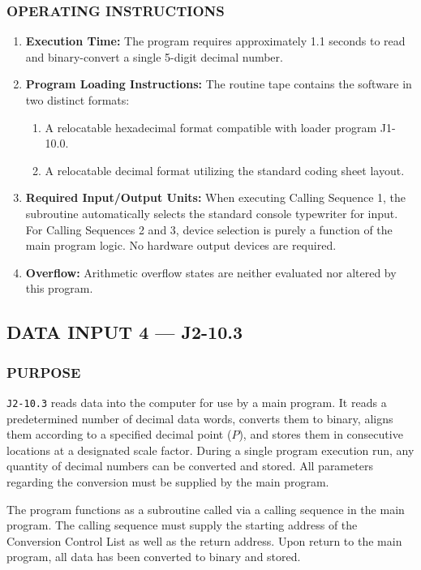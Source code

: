 \subsubsection*{OPERATING INSTRUCTIONS}
\begin{enumerate}
    \item \textbf{Execution Time:} The program requires approximately 1.1 seconds to read and binary-convert a single 5-digit decimal number.
    \item \textbf{Program Loading Instructions:} The routine tape contains the software in two distinct formats:
    \begin{enumerate}[label=\alph*)]
        \item A relocatable hexadecimal format compatible with loader program J1-10.0.
        \item A relocatable decimal format utilizing the standard coding sheet layout.
    \end{enumerate}
    \item \textbf{Required Input/Output Units:} When executing Calling Sequence 1, the subroutine automatically selects the standard console typewriter for input. For Calling Sequences 2 and 3, device selection is purely a function of the main program logic. No hardware output devices are required.
    \item \textbf{Overflow:} Arithmetic overflow states are neither evaluated nor altered by this program.
\end{enumerate}
\newpage
\subsection*{DATA INPUT 4 --- J2-10.3}
\label{sec:data-input-4}

\subsubsection*{PURPOSE}
\texttt{J2-10.3} reads data into the computer for use by a main program. It reads a predetermined number of decimal data words, converts them to binary, aligns them according to a specified decimal point ($P$), and stores them in consecutive locations at a designated scale factor. During a single program execution run, any quantity of decimal numbers can be converted and stored. All parameters regarding the conversion must be supplied by the main program.

The program functions as a subroutine called via a calling sequence in the main program. The calling sequence must supply the starting address of the Conversion Control List as well as the return address. Upon return to the main program, all data has been converted to binary and stored.


